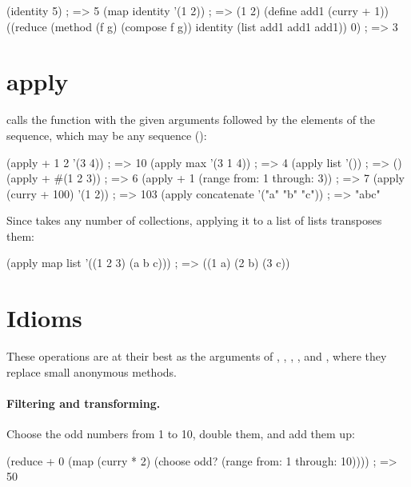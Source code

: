 \begin{dylan}
(identity 5)                ; => 5
(map identity '(1 2))       ; => (1 2)
(define add1 (curry + 1))
((reduce (method (f g) (compose f g)) identity (list add1 add1 add1)) 0)
; => 3
\end{dylan}

\section{apply}\label{sec:functional-apply}

 calls the
function with the given arguments followed by the elements of the
sequence, which may be any sequence ():

\begin{dylan}
(apply + 1 2 '(3 4))                    ; => 10
(apply max '(3 1 4))                    ; => 4
(apply list '())                        ; => ()
(apply + #(1 2 3))                      ; => 6
(apply + 1 (range from: 1 through: 3))  ; => 7
(apply (curry + 100) '(1 2))            ; => 103
(apply concatenate '("a" "b" "c"))      ; => "abc"
\end{dylan}

\noindent Since  takes any number of collections, applying it
to a list of lists transposes them:

\begin{dylan}
(apply map list '((1 2 3) (a b c)))     ; => ((1 a) (2 b) (3 c))
\end{dylan}

\section{Idioms}\label{sec:functional-idioms}

These operations are at their best as the arguments of ,
, , ,  and
, where they replace small anonymous methods.

\paragraph{Filtering and transforming.} Choose the odd numbers from 1 to
10, double them, and add them up:

\begin{dylan}
(reduce + 0 (map (curry * 2) (choose odd? (range from: 1 through: 10))))
; => 50
\end{dylan}

